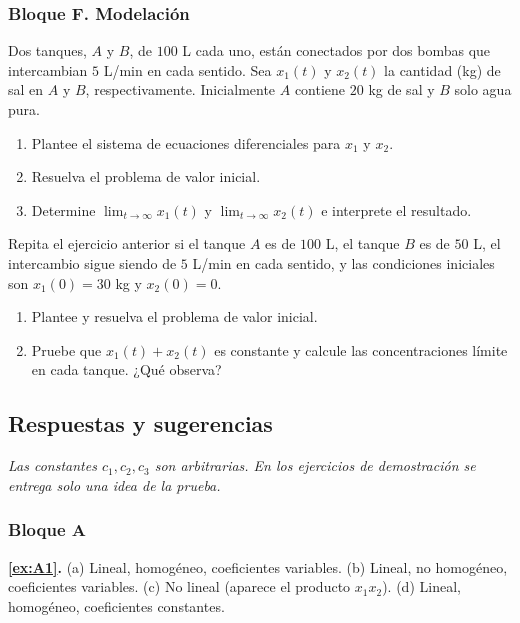 \subsubsection*{Bloque F. Modelación}

\begin{exercise}[\est{2}]\label{ex:F1}
Dos tanques, $A$ y $B$, de $100$ L cada uno, están conectados por dos bombas que intercambian $5$ L/min en cada sentido. Sea $x_1(t)$ y $x_2(t)$ la cantidad (kg) de sal en $A$ y $B$, respectivamente. Inicialmente $A$ contiene $20$ kg de sal y $B$ solo agua pura.
\begin{enumerate}[a]
    \item Plantee el sistema de ecuaciones diferenciales para $x_1$ y $x_2$.
    \item Resuelva el problema de valor inicial.
    \item Determine $\lim_{t\to\infty}x_1(t)$ y $\lim_{t\to\infty}x_2(t)$ e interprete el resultado.
\end{enumerate}
\end{exercise}

\begin{exercise}[\est{3}]\label{ex:F2}
Repita el ejercicio anterior si el tanque $A$ es de $100$ L, el tanque $B$ es de $50$ L, el intercambio sigue siendo de $5$ L/min en cada sentido, y las condiciones iniciales son $x_1(0) = 30$ kg y $x_2(0) = 0$.
\begin{enumerate}[a]
    \item Plantee y resuelva el problema de valor inicial.
    \item Pruebe que $x_1(t) + x_2(t)$ es constante y calcule las concentraciones límite en cada tanque. ¿Qué observa?
\end{enumerate}
\end{exercise}

\newpage
\subsection{Respuestas y sugerencias}

\noindent\emph{Las constantes $c_1, c_2, c_3$ son arbitrarias. En los ejercicios de demostración se entrega solo una idea de la prueba.}

\vspace{1ex}
\subsubsection*{Bloque A}
\noindent\textbf{\ref{ex:A1}.} (a) Lineal, homogéneo, coeficientes variables. (b) Lineal, no homogéneo, coeficientes variables. (c) No lineal (aparece el producto $x_1x_2$). (d) Lineal, homogéneo, coeficientes constantes.

